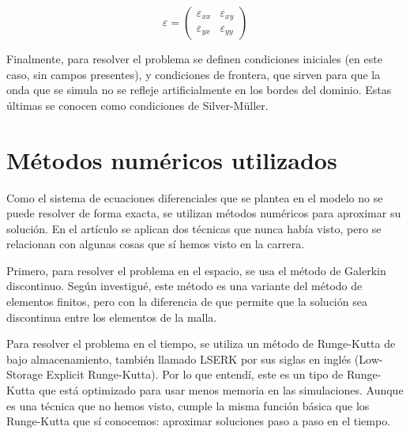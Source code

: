 \documentclass[10pt,a4paper]{article}
\begin{document}
\[
\varepsilon =
\begin{pmatrix}
\varepsilon_{xx} & \varepsilon_{xy} \\
\varepsilon_{yx} & \varepsilon_{yy}
\end{pmatrix}
\]

Finalmente, para resolver el problema se definen condiciones iniciales (en este caso, sin campos presentes), y condiciones de frontera, que sirven para que la onda que se simula no se refleje artificialmente en los bordes del dominio. Estas últimas se conocen como condiciones de Silver-Müller.

\section{Métodos numéricos utilizados}

Como el sistema de ecuaciones diferenciales que se plantea en el modelo no se puede resolver de forma exacta, se utilizan métodos numéricos para aproximar su solución. En el artículo se aplican dos técnicas que nunca había visto, pero se relacionan con algunas cosas que sí hemos visto en la carrera.

Primero, para resolver el problema en el espacio, se usa el método de Galerkin discontinuo. Según investigué, este método es una variante del método de elementos finitos, pero con la diferencia de que permite que la solución sea discontinua entre los elementos de la malla. 

Para resolver el problema en el tiempo, se utiliza un método de Runge-Kutta de bajo almacenamiento, también llamado LSERK por sus siglas en inglés (Low-Storage Explicit Runge-Kutta). Por lo que entendí, este es un tipo de Runge-Kutta que está optimizado para usar menos memoria en las simulaciones. Aunque es una técnica que no hemos visto, cumple la misma función básica que los Runge-Kutta que sí conocemos: aproximar soluciones paso a paso en el tiempo.
\end{document}
